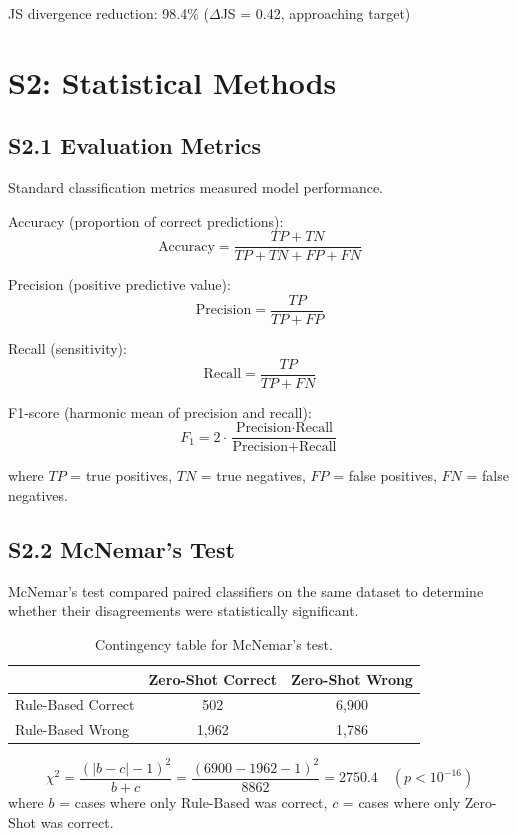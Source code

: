 \documentclass[12pt,a4paper]{article}
\begin{document}
\noindent JS divergence reduction: 98.4\% ($\Delta$JS = 0.42, approaching target)

\section{S2: Statistical Methods}
\label{sec:s2}

\subsection{S2.1 Evaluation Metrics}

Standard classification metrics measured model performance.

Accuracy (proportion of correct predictions):
\[
\text{Accuracy} = \frac{TP + TN}{TP + TN + FP + FN}
\]

Precision (positive predictive value):
\[
\text{Precision} = \frac{TP}{TP + FP}
\]

Recall (sensitivity):
\[
\text{Recall} = \frac{TP}{TP + FN}
\]

F1-score (harmonic mean of precision and recall):
\[
F_1 = 2 \cdot \frac{\text{Precision} \cdot \text{Recall}}{\text{Precision} + \text{Recall}}
\]

where $TP$ = true positives, $TN$ = true negatives, $FP$ = false positives, $FN$ = false negatives.

\bigskip
\subsection{S2.2 McNemar's Test}

McNemar's test compared paired classifiers on the same dataset to determine whether their disagreements were statistically significant.

\begin{table}[h]
\centering
\caption{Contingency table for McNemar's test.}
\begin{tabular}{@{}lcc@{}}
\toprule
 & Zero-Shot Correct & Zero-Shot Wrong \\
\midrule
Rule-Based Correct & 502 & 6,900 \\
Rule-Based Wrong & 1,962 & 1,786 \\
\bottomrule
\end{tabular}
\end{table}

\[
\chi^2 = \frac{(|b - c| - 1)^2}{b + c} = \frac{(6900 - 1962 - 1)^2}{8862} = 2750.4 \quad (p < 10^{-16})
\]
where $b$ = cases where only Rule-Based was correct, $c$ = cases where only Zero-Shot was correct.
\end{document}
